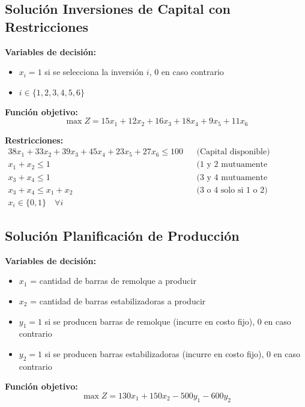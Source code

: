 \documentclass[12pt]{article}
\begin{document}
\subsection{Solución Inversiones de Capital con Restricciones}

\textbf{Variables de decisión:}
\begin{itemize}
    \item $x_i = 1$ si se selecciona la inversión $i$, 0 en caso contrario
    \item $i \in \{1, 2, 3, 4, 5, 6\}$
\end{itemize}

\textbf{Función objetivo:}
$$\max Z = 15x_1 + 12x_2 + 16x_3 + 18x_4 + 9x_5 + 11x_6$$

\textbf{Restricciones:}
\begin{align*}
    38x_1 + 33x_2 + 39x_3 + 45x_4 + 23x_5 + 27x_6 \leq 100 && \text{(Capital disponible)} \\
    x_1 + x_2 \leq 1 && \text{(1 y 2 mutuamente excluyentes)} \\
    x_3 + x_4 \leq 1 && \text{(3 y 4 mutuamente excluyentes)} \\
    x_3 + x_4 \leq x_1 + x_2 && \text{(3 o 4 solo si 1 o 2)} \\
    x_i \in \{0,1\} \quad \forall i
\end{align*}

\subsection{Solución Planificación de Producción}

\textbf{Variables de decisión:}
\begin{itemize}
    \item $x_1$ = cantidad de barras de remolque a producir
    \item $x_2$ = cantidad de barras estabilizadoras a producir
    \item $y_1 = 1$ si se producen barras de remolque (incurre en costo fijo), 0 en caso contrario
    \item $y_2 = 1$ si se producen barras estabilizadoras (incurre en costo fijo), 0 en caso contrario
\end{itemize}

\textbf{Función objetivo:}
$$\max Z = 130x_1 + 150x_2 - 500y_1 - 600y_2$$
\end{document}
